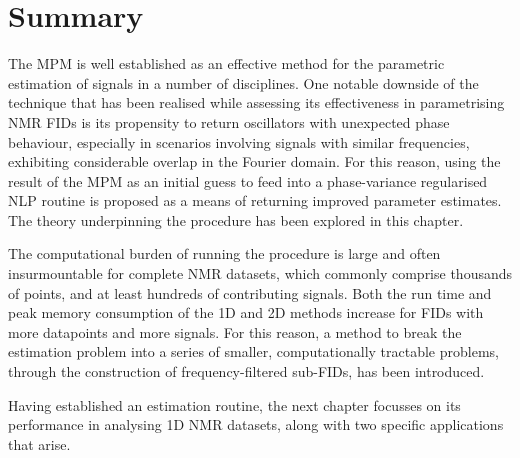 \section{Summary}
The \ac{MPM} is well established as an effective method for the parametric
estimation of signals in a number of disciplines.
One notable downside of the technique that has been realised while assessing
its effectiveness in parametrising \ac{NMR} \acp{FID} is its propensity to
return oscillators with unexpected phase behaviour, especially in scenarios
involving signals with similar frequencies, exhibiting considerable overlap in
the Fourier domain.
For this reason, using the result of the \ac{MPM} as an initial guess to feed
into a phase-variance regularised \ac{NLP} routine is proposed as a means of
returning improved parameter estimates. The theory underpinning the procedure
has been explored in this chapter.

The computational burden of running the procedure is large and often
insurmountable for complete \ac{NMR} datasets, which commonly comprise thousands of
points, and at least hundreds of contributing signals. Both the run time
and peak memory consumption of the \ac{1D} and \ac{2D} methods increase for \acp{FID} with more datapoints and more signals.
For this reason, a method to break the estimation problem into a
series of smaller, computationally tractable problems, through the construction
of frequency-filtered sub-\acp{FID}, has been introduced.

Having established an estimation routine, the next chapter focusses on its
performance in analysing \ac{1D} \ac{NMR} datasets, along with two specific
applications that arise.


